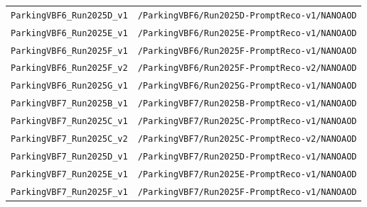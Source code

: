 \begin{longtable}{@{}>{\RaggedRight\arraybackslash}p{} >{\RaggedRight\arraybackslash}p{}@{}}
\addlinespace[2pt]
\texttt{ParkingVBF6\_\allowbreak{}Run2025D\_\allowbreak{}v1} & \texttt{/\allowbreak{}ParkingVBF6/\allowbreak{}Run2025D-\allowbreak{}PromptReco-\allowbreak{}v1/\allowbreak{}NANOAOD} \\
\addlinespace[2pt]
\texttt{ParkingVBF6\_\allowbreak{}Run2025E\_\allowbreak{}v1} & \texttt{/\allowbreak{}ParkingVBF6/\allowbreak{}Run2025E-\allowbreak{}PromptReco-\allowbreak{}v1/\allowbreak{}NANOAOD} \\
\addlinespace[2pt]
\texttt{ParkingVBF6\_\allowbreak{}Run2025F\_\allowbreak{}v1} & \texttt{/\allowbreak{}ParkingVBF6/\allowbreak{}Run2025F-\allowbreak{}PromptReco-\allowbreak{}v1/\allowbreak{}NANOAOD} \\
\addlinespace[2pt]
\texttt{ParkingVBF6\_\allowbreak{}Run2025F\_\allowbreak{}v2} & \texttt{/\allowbreak{}ParkingVBF6/\allowbreak{}Run2025F-\allowbreak{}PromptReco-\allowbreak{}v2/\allowbreak{}NANOAOD} \\
\addlinespace[2pt]
\texttt{ParkingVBF6\_\allowbreak{}Run2025G\_\allowbreak{}v1} & \texttt{/\allowbreak{}ParkingVBF6/\allowbreak{}Run2025G-\allowbreak{}PromptReco-\allowbreak{}v1/\allowbreak{}NANOAOD} \\
\addlinespace[2pt]
\texttt{ParkingVBF7\_\allowbreak{}Run2025B\_\allowbreak{}v1} & \texttt{/\allowbreak{}ParkingVBF7/\allowbreak{}Run2025B-\allowbreak{}PromptReco-\allowbreak{}v1/\allowbreak{}NANOAOD} \\
\addlinespace[2pt]
\texttt{ParkingVBF7\_\allowbreak{}Run2025C\_\allowbreak{}v1} & \texttt{/\allowbreak{}ParkingVBF7/\allowbreak{}Run2025C-\allowbreak{}PromptReco-\allowbreak{}v1/\allowbreak{}NANOAOD} \\
\addlinespace[2pt]
\texttt{ParkingVBF7\_\allowbreak{}Run2025C\_\allowbreak{}v2} & \texttt{/\allowbreak{}ParkingVBF7/\allowbreak{}Run2025C-\allowbreak{}PromptReco-\allowbreak{}v2/\allowbreak{}NANOAOD} \\
\addlinespace[2pt]
\texttt{ParkingVBF7\_\allowbreak{}Run2025D\_\allowbreak{}v1} & \texttt{/\allowbreak{}ParkingVBF7/\allowbreak{}Run2025D-\allowbreak{}PromptReco-\allowbreak{}v1/\allowbreak{}NANOAOD} \\
\addlinespace[2pt]
\texttt{ParkingVBF7\_\allowbreak{}Run2025E\_\allowbreak{}v1} & \texttt{/\allowbreak{}ParkingVBF7/\allowbreak{}Run2025E-\allowbreak{}PromptReco-\allowbreak{}v1/\allowbreak{}NANOAOD} \\
\addlinespace[2pt]
\texttt{ParkingVBF7\_\allowbreak{}Run2025F\_\allowbreak{}v1} & \texttt{/\allowbreak{}ParkingVBF7/\allowbreak{}Run2025F-\allowbreak{}PromptReco-\allowbreak{}v1/\allowbreak{}NANOAOD} \\

\end{longtable}
